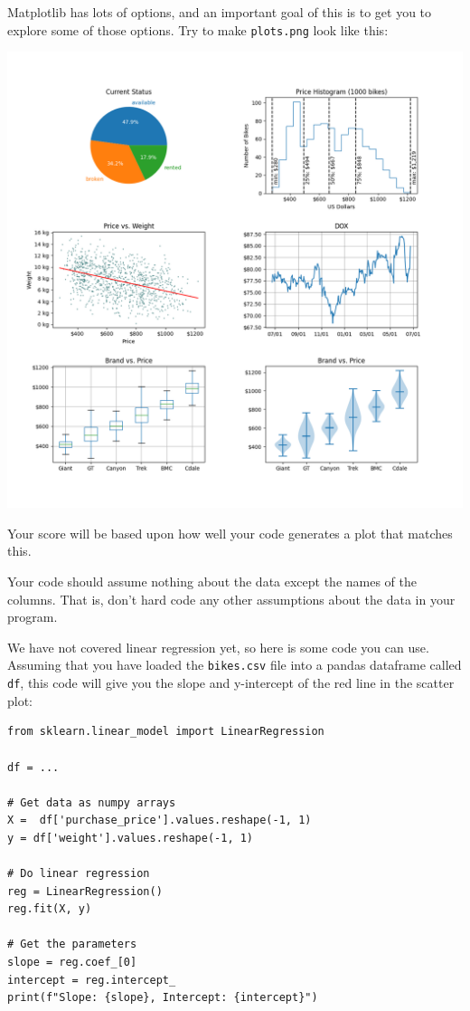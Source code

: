 \documentclass[11pt,english]{article}
\begin{document}
Matplotlib has lots of options,  and an important goal of this is to get you to explore some of those options.   Try to make \texttt{plots.png} look like this:

\includegraphics[width=\textwidth]{target.png}

Your score will be based upon how well your code generates a plot that matches this.

Your code should assume nothing about the data except the names of the columns.   That is, don't hard code any other assumptions about the data in your program.

We have not covered linear regression yet, so here is some code you can use.  Assuming that you have loaded the \texttt{bikes.csv} file into a pandas dataframe called \texttt{df}, this code will give you the slope and y-intercept of the red line in the scatter plot:

\begin{verbatim}
from sklearn.linear_model import LinearRegression

df = ...

# Get data as numpy arrays
X =  df['purchase_price'].values.reshape(-1, 1)
y = df['weight'].values.reshape(-1, 1)

# Do linear regression
reg = LinearRegression()
reg.fit(X, y)

# Get the parameters
slope = reg.coef_[0]
intercept = reg.intercept_
print(f"Slope: {slope}, Intercept: {intercept}")
\end{verbatim}
\end{document}
